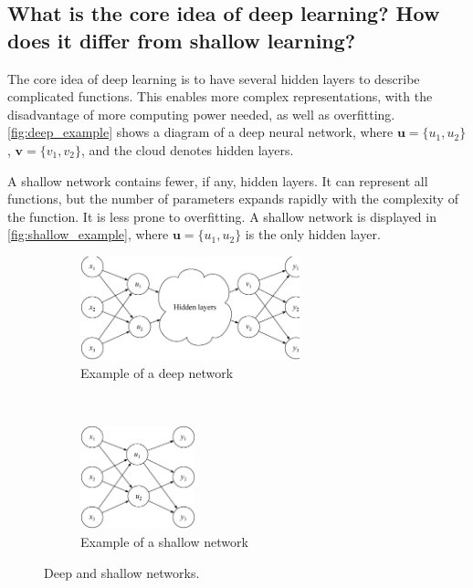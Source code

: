 \documentclass[../main.tex]{subfiles}
\begin{document}
\subsection{What is the core idea of deep learning? How does it differ from shallow learning?}

The core idea of deep learning is to have several hidden layers to describe complicated functions. This enables more complex representations, with the disadvantage of more computing power needed, as well as overfitting. \autoref{fig:deep_example} shows a diagram of a deep neural network, where $\mathbf{u}=\{u_1, u_2\}$, $\mathbf{v}=\{v_1, v_2\}$, and the cloud denotes hidden layers. 

A shallow network contains fewer, if any, hidden layers. It can represent all functions, but the number of parameters expands rapidly with the complexity of the function. It is less prone to overfitting. A shallow network is displayed in \autoref{fig:shallow_example}, where $\mathbf{u}=\{u_1, u_2\}$ is the only hidden layer.

\begin{figure}
    \centering
    \begin{subfigure}[b]{0.48\textwidth}
    	\centering
        \includegraphics[height=3cm]{figures/theory/deep_network}
        \caption{Example of a deep network}
        \label{fig:deep_example}
    \end{subfigure}
    ~
    \begin{subfigure}[b]{0.48\textwidth}
    	\centering
        \includegraphics[height=3cm]{figures/theory/shallow_network}
        \caption{Example of a shallow network}
        \label{fig:shallow_example}
    \end{subfigure}
    \caption{Deep and shallow networks.}\label{fig:deep_shallow}
\end{figure}
\end{document}
